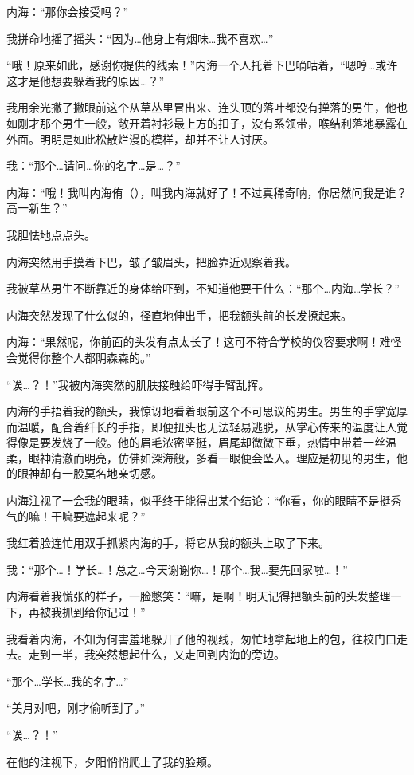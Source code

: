 内海：“那你会接受吗？”


我拼命地摇了摇头：“因为…他身上有烟味…我不喜欢…”

“哦！原来如此，感谢你提供的线索！”内海一个人托着下巴嘀咕着，“嗯哼…或许这才是他想要躲着我的原因…？”



我用余光撇了撇眼前这个从草丛里冒出来、连头顶的落叶都没有掸落的男生，他也如刚才那个男生一般，敞开着衬衫最上方的扣子，没有系领带，喉结利落地暴露在外面。明明是如此松散烂漫的模样，却并不让人讨厌。

我：“那个…请问…你的名字…是…？”

内海：“哦！我叫内海侑（），叫我内海就好了！不过真稀奇呐，你居然问我是谁？高一新生？”

我胆怯地点点头。

内海突然用手摸着下巴，皱了皱眉头，把脸靠近观察着我。

我被草丛男生不断靠近的身体给吓到，不知道他要干什么：“那个…内海…学长？”

内海突然发现了什么似的，径直地伸出手，把我额头前的长发撩起来。

内海：“果然呢，你前面的头发有点太长了！这可不符合学校的仪容要求啊！难怪会觉得你整个人都阴森森的。”

“诶…？！”我被内海突然的肌肤接触给吓得手臂乱挥。

内海的手捂着我的额头，我惊讶地看着眼前这个不可思议的男生。男生的手掌宽厚而温暖，配合着纤长的手指，即便扭头也无法轻易逃脱，从掌心传来的温度让人觉得像是要发烧了一般。他的眉毛浓密坚挺，眉尾却微微下垂，热情中带着一丝温柔，眼神清澈而明亮，仿佛如深海般，多看一眼便会坠入。理应是初见的男生，他的眼神却有一股莫名地亲切感。

内海注视了一会我的眼睛，似乎终于能得出某个结论：“你看，你的眼睛不是挺秀气的嘛！干嘛要遮起来呢？”

我红着脸连忙用双手抓紧内海的手，将它从我的额头上取了下来。

我：“那个…！学长…！总之…今天谢谢你…！那个…我…要先回家啦…！”

内海看着我慌张的样子，一脸憋笑：“嘛，是啊！明天记得把额头前的头发整理一下，再被我抓到给你记过！”

我看着内海，不知为何害羞地躲开了他的视线，匆忙地拿起地上的包，往校门口走去。走到一半，我突然想起什么，又走回到内海的旁边。

“那个…学长…我的名字…”

“美月对吧，刚才偷听到了。”

“诶…？！”

在他的注视下，夕阳悄悄爬上了我的脸颊。

